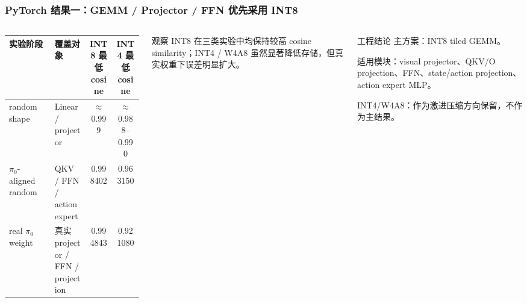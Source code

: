 \documentclass[10pt, aspectratio=169]{beamer}
\newcommand{\piZero}{\texorpdfstring{$\pi_0$}{pi0}\xspace}
\begin{document}
\begin{frame}
  \frametitle{PyTorch 结果一：GEMM / Projector / FFN 优先采用 INT8}
  \small
  \begin{columns}[T,onlytextwidth]
    \begin{table}
      \scriptsize
      \setlength{\tabcolsep}{3pt}
      \begin{tabular}{@{}p{0.34\linewidth}p{0.26\linewidth}cc@{}}
        \toprule
        实验阶段 & 覆盖对象 & INT8 最低 cosine & INT4 最低 cosine \\
        \midrule
        random shape & Linear / projector & $\approx$0.999 & $\approx$0.988--0.990 \\
        \piZero-aligned random & QKV / FFN / action expert & 0.998402 & 0.963150 \\
        real \piZero weight & 真实 projector / FFN / projection & 0.994843 & 0.921080 \\
        \bottomrule
      \end{tabular}
    \end{table}

    \begin{exampleblock}{观察}
      \footnotesize
      INT8 在三类实验中均保持较高 cosine similarity；INT4 / W4A8 虽然显著降低存储，但真实权重下误差明显扩大。
    \end{exampleblock}

    \begin{alertblock}{工程结论}
      \footnotesize
      主方案：INT8 tiled GEMM。\vspace{2pt}

      适用模块：visual projector、QKV/O projection、FFN、state/action projection、action expert MLP。\vspace{2pt}

      INT4/W4A8：作为激进压缩方向保留，不作为主结果。
    \end{alertblock}
  \end{columns}
\end{frame}
\end{document}
